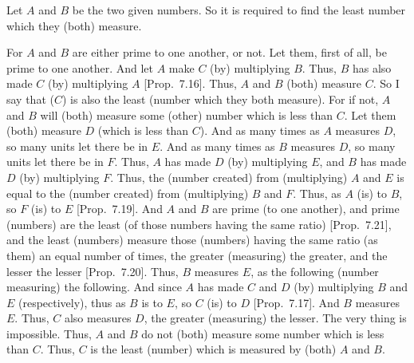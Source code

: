 Let $A$ and $B$ be the two given numbers. So it is required to find
the least number which they (both) measure.

\epsfysize=1.2in
\centerline{}

For $A$ and $B$ are either prime to one another, or not. Let them, first of all,
be prime to one another. And let $A$ make $C$ (by) multiplying $B$. Thus,
$B$ has also made $C$ (by) multiplying $A$ [Prop.~7.16]. Thus, $A$ and $B$ (both) measure $C$. So
I say that ($C$) is also the least (number which they both measure).
For if not, $A$ and $B$ will (both) measure some (other) number which is less than $C$. Let them (both) measure $D$ (which is less than $C$). And as many times
as $A$ measures $D$, so many units let there be in $E$. And as many times as $B$
measures $D$, so many units let there be in $F$. Thus, $A$ has made $D$ (by)
multiplying $E$, and $B$ has made $D$ (by) multiplying $F$. Thus, the
(number created) from (multiplying) $A$ and $E$ is equal to the (number created)
from (multiplying) $B$ and $F$. Thus, as $A$ (is) to $B$, so $F$ (is) to $E$ [Prop.~7.19]. And $A$ and $B$ are prime (to one another), and prime (numbers) are the least (of those numbers having
the same ratio)  [Prop.~7.21], and the
least (numbers) measure those (numbers) having the same
ratio (as them) an equal number of times, the greater (measuring) the greater,
and
the lesser the lesser [Prop.~7.20].
Thus, $B$ measures $E$, as the following (number measuring) the following.
And since $A$ has made $C$ and $D$ (by) multiplying $B$ and $E$ (respectively),
thus as $B$ is to $E$, so $C$ (is) to $D$ [Prop.~7.17]. 
And $B$ measures $E$. Thus, $C$ also measures $D$, the greater (measuring) the
lesser. The very thing is impossible. Thus, $A$ and $B$ do not (both) measure some
number which is less than $C$. Thus, $C$ is the least (number) which is
measured by (both) $A$ and $B$.

\epsfysize=1.5in
\centerline{}


